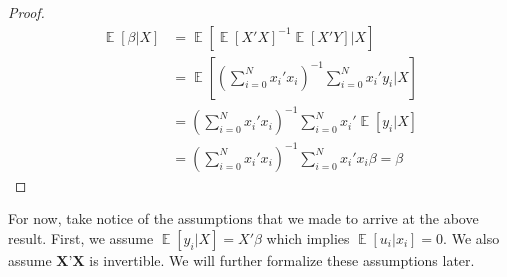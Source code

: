 \documentclass[dvips,11pt]{article}
\DeclareMathOperator{\?}{\,?\,}
\DeclareMathOperator{\E}{\mathbb{E}}
\newenvironment{remark}[1][Remark]{\begin{trivlist}
\item[\hskip \labelsep {\bfseries #1.}]}{\end{trivlist}}
\begin{document}
\begin{proof} 
$$
\begin{aligned}
\E [\beta|X] &= \E[\E[X'X]^{-1}\E[X'Y]|X] \\
& = \E[(\sum^N_{i=0}x_i'x_i)^{-1}\sum^N_{i=0}x_i'y_i | X] \\
& = (\sum^N_{i=0}x_i'x_i)^{-1}\sum^N_{i=0}x_i'\E[y_i|X] \\
& = (\sum^N_{i=0}x_i'x_i)^{-1}\sum^N_{i=0}x_i'x_i\beta = \beta
\end{aligned}
$$
\end{proof}
\begin{remark}For now, take notice of the assumptions that we made to arrive at the above result. First, we assume $\E[y_i|X]=X'\beta$ which implies $\E[u_i|x_i] = 0$. We also assume $\textbf{X'X}$ is invertible. We will further formalize these assumptions later.\end{remark}
\end{document}
